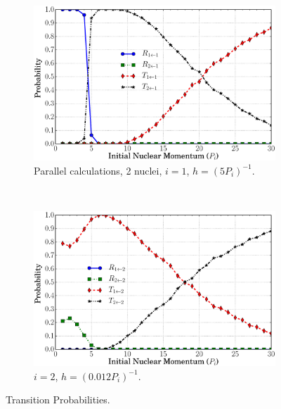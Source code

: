 \documentclass[xetex,mathserif,serif]{beamer}
\begin{document}
\begin{frame}
{\begin{figure}
\begin{subfigure}[t]{0.45\textwidth}
\label{f:sccomp}
\end{subfigure}
\\[-0.3cm]
\begin{subfigure}[t]{0.45\textwidth}
\centering
\includegraphics[width=\textwidth]{sc_prob_parallel.eps}
\vspace{-0.35cm}
\caption{{\fontsize{7}{8}\selectfont Parallel calculations, 2 nuclei, $ i = 1 $, $ h=(5P_{i})^{-1} $.}}
\label{f:scpar}
\end{subfigure}
~
\begin{subfigure}[t]{0.45\textwidth}
\centering
\includegraphics[width=\textwidth]{sc_prob_i2.eps}
\caption{{\fontsize{7}{8}\selectfont $ i = 2 $, $ h = (0.012P_{i})^{-1} $.}}
\label{f:sci2}
\end{subfigure}
\vspace{-0.47cm}
\caption{Transition Probabilities.}
\end{figure}
}{}
\end{frame}
\end{document}
